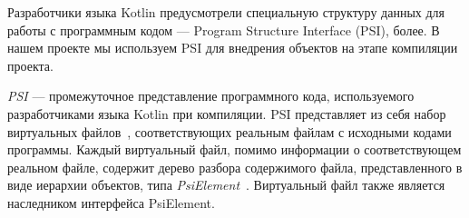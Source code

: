 Разработчики языка Kotlin предусмотрели специальную структуру данных для работы
с программным кодом --- Program Structure Interface (PSI), более.
В нашем проекте мы используем PSI для внедрения объектов на этапе компиляции
проекта.

\textit{PSI} --- промежуточное представление программного кода, используемого
разработчиками языка Kotlin при компиляции.
PSI представляет из себя набор виртуальных файлов~\cite{psi_file},
соответствующих реальным файлам с исходными кодами программы.
Каждый виртуальный файл, помимо информации о соответствующем реальном файле,
содержит дерево разбора содержимого файла, представленного в виде иерархии
объектов, типа \textit{PsiElement}~\cite{psi_element}.
Виртуальный файл также является наследником интерфейса PsiElement.

